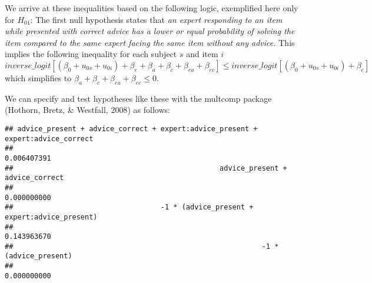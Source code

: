 \documentclass[
  man,floatsintext]{apa6}
\newenvironment{Shaded}{\begin{snugshade}}{\end{snugshade}}
\newcommand{\AttributeTok}[1]{\textcolor[rgb]{0.13,0.29,0.53}{#1}}
\newcommand{\FunctionTok}[1]{\textcolor[rgb]{0.13,0.29,0.53}{\textbf{#1}}}
\newcommand{\NormalTok}[1]{#1}
\newcommand{\OtherTok}[1]{\textcolor[rgb]{0.56,0.35,0.01}{#1}}
\newcommand{\SpecialCharTok}[1]{\textcolor[rgb]{0.81,0.36,0.00}{\textbf{#1}}}
\newcommand{\StringTok}[1]{\textcolor[rgb]{0.31,0.60,0.02}{#1}}
\begin{document}
We arrive at these inequalities based on the following logic, exemplified here only for \(H_{01}\): The first null hypothesis states that \emph{an expert responding to an item while presented with correct advice has a lower or equal probability of solving the item compared to the same expert facing the same item without any advice.} This implies the following inequality for each subject \(s\) and item \(i\) \[
inverse\_logit[(\beta_0 + u_{0s} + u_{0i}) + \beta_e + \beta_{a} + \beta_{c} + \beta_{ea} + \beta_{ec}] \leq inverse\_logit[(\beta_0 + u_{0s} + u_{0i}) + \beta_e]
\] which simplifies to \(\beta_{a} + \beta_{c} + \beta_{ea} + \beta_{ec} \leq 0\).

We can specify and test hypotheses like these with the multcomp package (Hothorn, Bretz, \& Westfall, 2008) as follows:

\begin{Shaded}
\end{Shaded}

\begin{verbatim}
## advice_present + advice_correct + expert:advice_present + expert:advice_correct 
##                                                                     0.006407391 
##                                                 advice_present + advice_correct 
##                                                                     0.000000000 
##                                   -1 * (advice_present + expert:advice_present) 
##                                                                     0.143963670 
##                                                           -1 * (advice_present) 
##                                                                     0.000000000
\end{verbatim}
\end{document}
